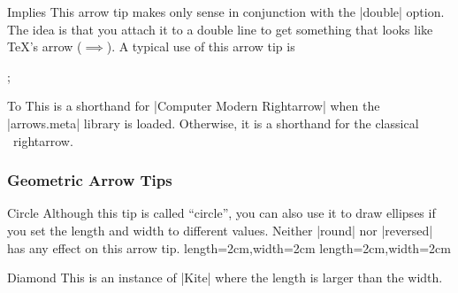 \begin{arrowtipsimple}{Implies}
    This arrow tip makes only sense in conjunction with the |double| option.
    The idea is that you attach it to a double line to get something that looks
    like \TeX's \texttt{\string\implies} arrow ($\implies$). A typical use of
    this arrow tip is
\begin{codeexample}[preamble={\usetikzlibrary{arrows.meta,graphs}}]
\tikz {};
\end{codeexample}
    \begin{arrowexamples}
        \arrowexampledouble[]
        \arrowexampledouble[red]
    \end{arrowexamples}
\end{arrowtipsimple}

\begin{arrowtipsimple}{To}
    This is a shorthand for |Computer Modern Rightarrow| when the |arrows.meta|
    library is loaded. Otherwise, it is a shorthand for the classical
    \tikzname\ rightarrow.
\end{arrowtipsimple}


\subsubsection{Geometric Arrow Tips}

\begin{arrowtip}{Circle}{
    Although this tip is called ``circle'', you can also use it to draw
    ellipses if you set the length and width to different values. Neither
    |round| nor |reversed| has any effect on this arrow tip.
}%
{length=2cm,width=2cm}%
{length=2cm,width=2cm}

    \begin{arrowexamples}
        \arrowexample[]
        \arrowexampledup[sep]
        \arrowexampledupdot[sep]
        \arrowexample[open]
        \arrowexample[length=3pt]
        \arrowexample[slant=.3]
        \arrowexample[left]
        \arrowexample[right]
        \arrowexample[red]
    \end{arrowexamples}
\end{arrowtip}

\begin{arrowtipsimple}{Diamond}
    This is an instance of |Kite| where the length is larger than the width.
    \begin{arrowexamples}
        \arrowexample[]
        \arrowexampledup[]
        \arrowexampledupdot[]
        \arrowexample[open]
        \arrowexample[length=10pt]
        \arrowexample[round]
        \arrowexample[slant=.3]
        \arrowexample[left]
        \arrowexample[right]
        \arrowexample[red]
        \arrowexample[fill=red!50]
    \end{arrowexamples}
\end{arrowtipsimple}

